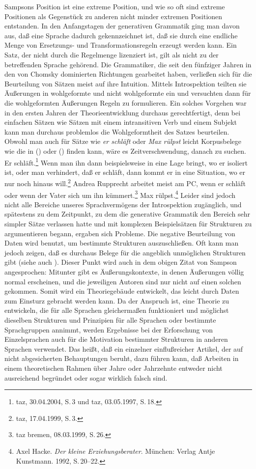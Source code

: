 Sampsons Position ist eine extreme Position, und wie so oft sind extreme Positionen als Gegenstück
zu anderen nicht minder extremen Positionen entstanden. In den Anfangstagen der generativen Grammatik ging man davon aus,
daß eine Sprache dadurch gekennzeichnet ist, daß sie durch eine endliche Menge von Ersetzungs- und
Transformationsregeln erzeugt werden kann. Ein Satz, der nicht durch die Regelmenge lizenziert ist,
gilt als nicht zu der betreffenden Sprache gehörend. Die Grammatiker, die
seit den fünfziger Jahren in den von Chomsky dominierten Richtungen gearbeitet haben, verließen
sich für die Beurteilung von Sätzen meist auf ihre Intuition. Mittels Introspektion teilten sie
Äußerungen in wohlgeformte und nicht wohlgeformte ein und versuchten dann für die wohlgeformten
Äußerungen Regeln zu formulieren. Ein solches Vorgehen war in den ersten Jahren der Theorieentwicklung
durchaus gerechtfertigt, denn bei einfachen Sätzen wie \zb Sätzen mit einem intransitiven Verb
und einem Subjekt kann man durchaus problemlos die Wohlgeformtheit des Satzes beurteilen.
Obwohl man auch für Sätze wie \emph{er schläft} oder \emph{Max rülpst} leicht Korpusbelege
wie die in () oder () finden kann, wäre es Zeitverschwendung, danach zu suchen.
\eal
\ex Er schläft.\footnote{
  taz, 30.04.2004, S.\,3 und taz, 03.05.1997, S.\,18.
}
\ex Wenn man ihn dann beispielsweise in eine Lage bringt, wo er isoliert ist, oder man verhindert, 
    daß er schläft, dann kommt er in eine Situation, wo er nur noch hinaus will.\footnote{
  taz, 17.04.1999, S.\,3.
}
\ex Andrea Rupprecht arbeitet meist am PC, wenn er schläft oder wenn der Vater sich um ihn kümmert.\footnote{
  taz bremen,  08.03.1999, S.\,26.
}
\zl
\ea
Max rülpst.\footnote{
  Axel Hacke. \emph{Der kleine Erziehungsberater}. München: Verlag Antje Kunstmann. 1992, S.\,20--22.%
}
\z
Leider sind jedoch nicht alle Bereiche unseres Sprachvermögens der Introspektion zugänglich, und
spätestens zu dem Zeitpunkt, zu dem die generative Grammatik den Bereich sehr simpler Sätze verlassen
hatte und mit komplexen Beispielsätzen für Strukturen zu argumentieren begann, ergaben sich Probleme.
Die negative Beurteilung von Daten wird benutzt, um bestimmte Strukturen auszuschließen. Oft kann man
jedoch zeigen, daß es durchaus Belege für die angeblich unmöglichen Strukturen gibt (siehe auch ).
Dieser Punkt wird auch in dem obigen Zitat von Sampson angesprochen: Mitunter gibt es Äußerungskontexte, in denen
Äußerungen völlig normal erscheinen, und die jeweiligen Autoren sind nur nicht auf einen solchen gekommen.
Somit wird ein Theoriegebäude entwickelt, das leicht durch Daten zum Einsturz gebracht werden kann.
Da der Anspruch ist, eine Theorie zu entwickeln, die für alle Sprachen gleichermaßen funktioniert
und möglichst dieselben Strukturen und Prinzipien für alle Sprachen oder bestimmte Sprachgruppen
annimmt, werden Ergebnisse bei der Erforschung von Einzelsprachen auch für die Motivation
bestimmter Strukturen in anderen Sprachen verwendet. Das heißt, daß ein einzelner einflußreicher
Artikel, der auf nicht abgesicherten Behauptungen beruht, dazu führen kann, daß Arbeiten
in einem theoretischen Rahmen über Jahre oder Jahrzehnte entweder nicht ausreichend begründet 
oder sogar wirklich falsch sind.

